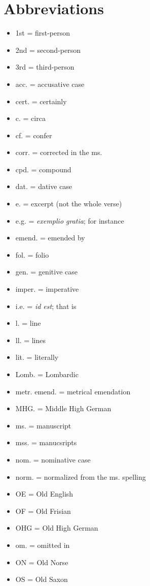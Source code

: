 \thispagestyle{empty}\section{Abbreviations}
  \begin{itemize}
    \item 1st = first-person
    \item 2nd = second-person
    \item 3rd = third-person
    \item acc. = accusative case
    \item cert. = certainly
    \item c. = circa
    \item cf. = confer
    \item corr. = corrected in the ms.
    \item cpd. = compound
    \item dat. = dative case
    \item e. = excerpt (not the whole verse)
    \item e.g. = \emph{exemplio gratia}; for instance
    \item emend. = emended by
    \item fol. = folio
    \item gen. = genitive case
    \item imper. = imperative
    \item i.e. = \emph{id est}; that is
    \item l. = line
    \item ll. = lines
    \item lit. = literally
    \item Lomb. = Lombardic
    \item metr. emend. = metrical emendation
    \item MHG. = Middle High German
    \item ms. = manuscript
    \item mss. = manucsripts
    \item nom. = nominative case
    \item norm. = normalized from the ms. spelling
    \item OE = Old English
    \item OF = Old Frisian
    \item OHG = Old High German
    \item om. = omitted in
    \item ON = Old Norse
    \item OS = Old Saxon

\end{itemize}
